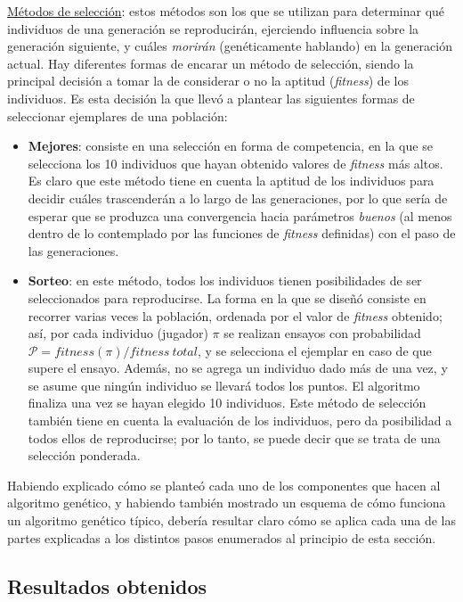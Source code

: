 \documentclass[12pt,a4paper]{article}
\begin{document}
    \underline{Métodos de selección}: estos métodos son los que se utilizan para determinar qué individuos de una generación se reproducirán, ejerciendo influencia sobre la generación siguiente, y cuáles \textit{morirán} (genéticamente hablando) en la generación actual. Hay diferentes formas de encarar un método de selección, siendo la principal decisión a tomar la de considerar o no la aptitud (\textit{fitness}) de los individuos. Es esta decisión la que llevó a plantear las siguientes formas de seleccionar ejemplares de una población:
        \begin{itemize}
            \item \textbf{Mejores}: consiste en una selección en forma de competencia, en la que se selecciona los 10 individuos que hayan obtenido valores de \textit{fitness} más altos. Es claro que este método tiene en cuenta la aptitud de los individuos para decidir cuáles trascenderán a lo largo de las generaciones, por lo que sería de esperar que se produzca una convergencia hacia parámetros \textit{buenos} (al menos dentro de lo contemplado por las funciones de \textit{fitness} definidas) con el paso de las generaciones.
            \item \textbf{Sorteo}: en este método, todos los individuos tienen posibilidades de ser seleccionados para reproducirse. La forma en la que se diseñó consiste en recorrer varias veces la población, ordenada por el valor de \textit{fitness} obtenido; así, por cada individuo (jugador) $\pi$ se realizan ensayos con probabilidad $\mathcal{P}=fitness(\pi) / fitness \ total$, y se selecciona el ejemplar en caso de que supere el ensayo. Además, no se agrega un individuo dado más de una vez, y se asume que ningún individuo se llevará todos los puntos. El algoritmo finaliza una vez se hayan elegido 10 individuos. Este método de selección también tiene en cuenta la evaluación de los individuos, pero da posibilidad a todos ellos de reproducirse; por lo tanto, se puede decir que se trata de una selección ponderada.
        \end{itemize}
        
    Habiendo explicado cómo se planteó cada uno de los componentes que hacen al algoritmo genético, y habiendo también mostrado un esquema de cómo funciona un algoritmo genético típico, debería resultar claro cómo se aplica cada una de las partes explicadas a los distintos pasos enumerados al principio de esta sección.
    
    
    \subsection{Resultados obtenidos}
    
\end{document}
